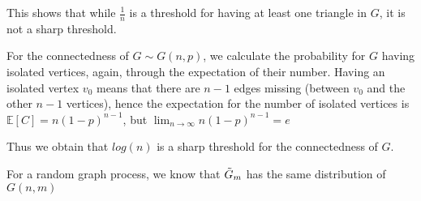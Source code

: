 \documentclass{article}
\begin{document}
This shows that while $\frac{1}{n}$ is a threshold for having at least one triangle in $G$, it is not a sharp threshold.

For the connectedness of $G\sim{G(n,p)}$, we calculate the probability for $G$ having isolated vertices, again, through the expectation of their number. Having an isolated vertex $v_0$ means that there are $n-1$ edges missing (between $v_0$ and the other $n-1$ vertices), hence the expectation for the number of isolated vertices is $\mathbb{E}[C]=n(1-p)^{n-1}$, but $\lim_{n\rightarrow\infty}n(1-p)^{n-1}=e^{}$

Thus we obtain that $log(n)$ is a sharp threshold for the connectedness of $G$.

For a random graph process, we know that $\Tilde{G}_m$ has the same distribution of $G(n,m)$
\end{document}
